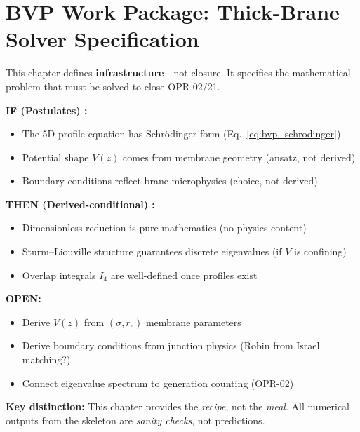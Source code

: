 
\section{BVP Work Package: Thick-Brane Solver Specification}
\label{sec:ch12_bvp_workpackage}


\begin{tcolorbox}[edcGuardrail, title=\textbf{Epistemic Status}]
This chapter defines \textbf{infrastructure}---not closure. It specifies the
mathematical problem that must be solved to close OPR-02/21.

\textbf{IF (Postulates) \tagP{}:}
\begin{itemize}[nosep]
    \item The 5D profile equation has Schrödinger form (Eq.~\eqref{eq:bvp_schrodinger})
    \item Potential shape $V(z)$ comes from membrane geometry (ansatz, not derived)
    \item Boundary conditions reflect brane microphysics (choice, not derived)
\end{itemize}

\textbf{THEN (Derived-conditional) \tagDc{}:}
\begin{itemize}[nosep]
    \item Dimensionless reduction is pure mathematics (no physics content)
    \item Sturm--Liouville structure guarantees discrete eigenvalues (if $V$ is confining)
    \item Overlap integrals $I_4$ are well-defined once profiles exist
\end{itemize}

\textbf{OPEN:}
\begin{itemize}[nosep]
    \item Derive $V(z)$ from $(\sigma, r_e)$ membrane parameters
    \item Derive boundary conditions from junction physics (Robin from Israel matching?)
    \item Connect eigenvalue spectrum to generation counting (OPR-02)
\end{itemize}

\textbf{Key distinction:} This chapter provides the \emph{recipe}, not the \emph{meal}.
All numerical outputs from the skeleton are \emph{sanity checks}, not predictions.
\end{tcolorbox}

